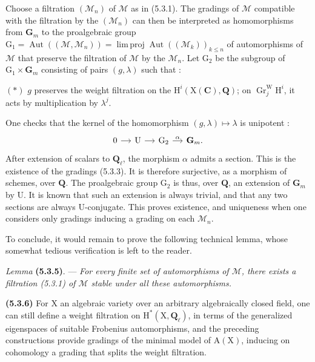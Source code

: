\documentclass[11pt,leqno]{article}
\begin{document}
Choose a filtration \((\mathscr{M}_n)\) of \(\mathscr{M}\) as in
(5.3.1). The gradings of \(\mathscr{M}\) compatible with the filtration
by the \((\mathscr{M}_n)\) can then be interpreted as homomorphisms
from \(\mathbf{G}_m\) to the proalgebraic group
\(\mathrm{G}_1=\operatorname{Aut}((\mathscr{M},\mathscr{M}_n))
=\operatorname{lim\,proj}\operatorname{Aut}((\mathscr{M}_k))_{k\leq n}\)
of automorphisms of \(\mathscr{M}\) that preserve the filtration of
\(\mathscr{M}\) by the \(\mathscr{M}_n\). Let \(\mathrm{G}_2\) be the
subgroup of \(\mathrm{G}_1\times\mathbf{G}_m\) consisting of pairs
\((g,\lambda)\) such that :

\((*)\) \(g\) preserves the weight filtration on the
\(\mathrm{H}^i(\mathrm{X}(\mathbf{C}),\mathbf{Q})\); on
\(\operatorname{Gr}^{\mathrm{W}}_j\mathrm{H}^i\), it acts by
multiplication by \(\lambda^j\).

One checks that the kernel of the homomorphism
\((g,\lambda)\mapsto\lambda\) is unipotent :
\[
\begin{tikzcd}[column sep=small]
0 \arrow[r] &
\mathrm{U} \arrow[r] &
\mathrm{G}_2 \arrow[r,"\alpha"] &
\mathbf{G}_m .
\end{tikzcd}
\]
After extension of scalars to \(\mathbf{Q}_\ell\), the morphism
\(\alpha\) admits a section. This is the existence of the gradings (5.3.3).
It is therefore surjective, as a morphism of schemes, over \(\mathbf{Q}\).
The proalgebraic group \(\mathrm{G}_2\) is thus, over \(\mathbf{Q}\),
an extension of \(\mathbf{G}_m\) by \(\mathrm{U}\). It is known that such an
extension is always trivial, and that any two sections are always
\(\mathrm{U}\)-conjugate. This proves existence, and uniqueness when
one considers only gradings inducing a grading on each
\(\mathscr{M}_n\).

To conclude, it would remain to prove the following technical lemma, whose
somewhat tedious verification is left to the reader.

\textit{Lemma} \textbf{(5.3.5)}. — \textit{For every finite set
of automorphisms of \(\mathscr{M}\), there exists a filtration
\textup{(5.3.1)} of \(\mathscr{M}\) stable under all these automorphisms.}

\textbf{(5.3.6)} For \(\mathrm{X}\) an algebraic variety over an
arbitrary algebraically closed field, one can still define a weight
filtration on \(\mathrm{H}^*(\mathrm{X},\mathbf{Q}_\ell)\), in terms
of the generalized eigenspaces of suitable Frobenius
automorphisms, and the preceding constructions provide
gradings of the minimal model of \(\mathrm{A}(\mathrm{X})\), inducing
on cohomology a grading that splits the weight filtration.
\end{document}

